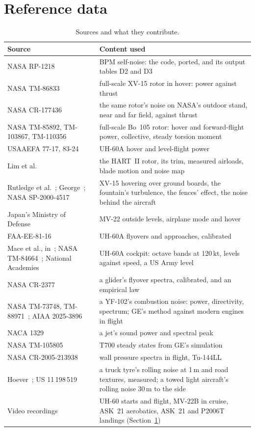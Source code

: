\documentclass[10pt,a4paper,twocolumn]{article}
\begin{document}
\section{Reference data}\label{sec:ref}
\begin{table}[t]
\centering\small
\caption{Sources and what they contribute.}\label{tab:sources}
\begin{tabularx}{\columnwidth}{@{}>{\raggedright\arraybackslash}p{2.55cm}X@{}}
\toprule
Source & Content used \\
\midrule
NASA RP-1218~\cite{bpm} & BPM self-noise: the code, ported, and its output tables D2 and D3 \\
NASA TM-86833~\cite{fb} & full-scale XV-15 rotor in hover: power against thrust \\
NASA CR-177436~\cite{atb} & the same rotor's noise on NASA's outdoor stand, near and far field, against thrust \\
NASA TM-85892, TM-103867, TM-110356~\cite{pw,pj,pm} & full-scale Bo~105 rotor: hover and forward-flight power, collective, steady torsion moment \\
USAAEFA 77-17, 83-24~\cite{a7717,a8324} & UH-60A hover and level-flight power \\
Lim et al.~\cite{lim} & the HART~II rotor, its trim, measured airloads, blade motion and noise map \\
Rutledge et al.~\cite{rcg}; George~\cite{george}; NASA SP-2000-4517~\cite{ma} & XV-15 hovering over ground boards, the fountain's turbulence, the fences' effect, the noise behind the aircraft \\
Japan's Ministry of Defense~\cite{mod} & MV-22 outside levels, airplane mode and hover \\
FAA-EE-81-16~\cite{faa} & UH-60A flyovers and approaches, calibrated \\
Mace et al., in~\cite{usaarl}; NASA TM-84664~\cite{tm84664}; National Academies~\cite{nas} & UH-60A cockpit: octave bands at 120\,kt, levels against speed, a US Army level \\
NASA CR-2377~\cite{healy} & a glider's flyover spectra, calibrated, and an empirical law \\
NASA TM-73748, TM-88971~\cite{karchmer,krejsa}; AIAA 2025-3896~\cite{nesbitt} & a YF-102's combustion noise: power, directivity, spectrum; GE's method against modern engines in flight \\
NACA 1329~\cite{naca} & a jet's sound power and spectral peak \\
NASA TM-105805~\cite{ge} & T700 steady states from GE's simulation \\
NASA CR-2005-213938~\cite{tu144} & wall pressure spectra in flight, Tu-144LL \\
Hoever~\cite{hoever}; US 11\,198\,519~\cite{seeley} & a truck tyre's rolling noise at 1\,m and road textures, measured; a towed light aircraft's rolling noise 30\,m to the side \\
Video recordings & UH-60 starts and flight, MV-22B in cruise, ASK~21 aerobatics, ASK~21 and P2006T landings (Section~\ref{sec:ref}) \\
\bottomrule
\end{tabularx}
\end{table}
\end{document}
